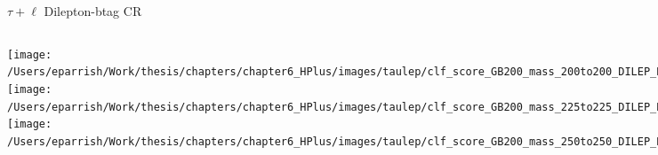 \documentclass[aspectratio=169,xcolor=table]{beamer}
\begin{document}
    \begin{frame}[t]{$\tau+\ell$ Dilepton-btag CR}
      \begin{columns}[t]
          \texttt{[image: /Users/eparrish/Work/thesis/chapters/chapter6\_HPlus/images/taulep/clf\_score\_GB200\_mass\_200to200\_DILEP\_BTAG.png]}
          \texttt{[image: /Users/eparrish/Work/thesis/chapters/chapter6\_HPlus/images/taulep/clf\_score\_GB200\_mass\_225to225\_DILEP\_BTAG.png]}
          \texttt{[image: /Users/eparrish/Work/thesis/chapters/chapter6\_HPlus/images/taulep/clf\_score\_GB200\_mass\_250to250\_DILEP\_BTAG.png]}

          \texttt{[image: /Users/eparrish/Work/thesis/chapters/chapter6\_HPlus/images/taulep/clf\_score\_GB200\_mass\_275to275\_DILEP\_BTAG.png]}
          \texttt{[image: /Users/eparrish/Work/thesis/chapters/chapter6\_HPlus/images/taulep/clf\_score\_GB200\_mass\_300to300\_DILEP\_BTAG.png]}
          \texttt{[image: /Users/eparrish/Work/thesis/chapters/chapter6\_HPlus/images/taulep/clf\_score\_GB200\_mass\_350to350\_DILEP\_BTAG.png]}

          \texttt{[image: /Users/eparrish/Work/thesis/chapters/chapter6\_HPlus/images/taulep/clf\_score\_GB200\_mass\_400to400\_DILEP\_BTAG.png]}
          \texttt{[image: /Users/eparrish/Work/thesis/chapters/chapter6\_HPlus/images/taulep/clf\_score\_GB200\_mass\_500to500\_DILEP\_BTAG.png]}
          \texttt{[image: /Users/eparrish/Work/thesis/chapters/chapter6\_HPlus/images/taulep/clf\_score\_GB200\_mass\_600to600\_DILEP\_BTAG.png]}

          \texttt{[image: /Users/eparrish/Work/thesis/chapters/chapter6\_HPlus/images/taulep/clf\_score\_GB200\_mass\_700to700\_DILEP\_BTAG.png]}
          \texttt{[image: /Users/eparrish/Work/thesis/chapters/chapter6\_HPlus/images/taulep/clf\_score\_GB200\_mass\_800to800\_DILEP\_BTAG.png]}
          \texttt{[image: /Users/eparrish/Work/thesis/chapters/chapter6\_HPlus/images/taulep/clf\_score\_GB200\_mass\_900to900\_DILEP\_BTAG.png]}

      \end{columns}
    \end{frame}
\end{document}
